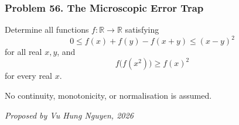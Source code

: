 \subsubsection*{Problem 56. The Microscopic Error Trap}

\begin{exercisebox}[medium]

Determine all functions $f:\mathbb R\to\mathbb R$ satisfying
\[
\boxed{\qquad
0\le f(x)+f(y)-f(x+y)\le(x-y)^2
\qquad} \tag{1}
\]
for all real $x,y$, and
\[
\boxed{\qquad
f\bigl(f(x^2)\bigr)\ge f(x)^2
\qquad} \tag{2}
\]
for every real $x$.

No continuity, monotonicity, or normalisation is assumed.

\begin{flushright}
\textit{Proposed by Vu Hung Nguyen, 2026}
\end{flushright}


\end{exercisebox}
